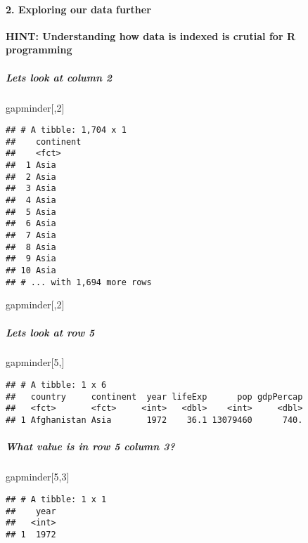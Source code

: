 \documentclass[]{article}
\newenvironment{Shaded}{\begin{snugshade}}{\end{snugshade}}
\newcommand{\DecValTok}[1]{\textcolor[rgb]{0.00,0.00,0.81}{#1}}
\newcommand{\NormalTok}[1]{#1}
\let\oldparagraph\paragraph
\renewcommand{\paragraph}[1]{\oldparagraph{#1}\mbox{}}
\let\oldsubparagraph\subparagraph
\renewcommand{\subparagraph}[1]{\oldsubparagraph{#1}\mbox{}}
\begin{document}
\paragraph{2. Exploring our data
further}\label{exploring-our-data-further}

\textbf{HINT: Understanding how data is indexed is crutial for R
programming}

\subparagraph{Lets look at column 2}\label{lets-look-at-column-2}

\begin{Shaded}
\begin{Highlighting}[]
\NormalTok{gapminder[,}\DecValTok{2}\NormalTok{]}
\end{Highlighting}
\end{Shaded}

\begin{verbatim}
## # A tibble: 1,704 x 1
##    continent
##    <fct>    
##  1 Asia     
##  2 Asia     
##  3 Asia     
##  4 Asia     
##  5 Asia     
##  6 Asia     
##  7 Asia     
##  8 Asia     
##  9 Asia     
## 10 Asia     
## # ... with 1,694 more rows
\end{verbatim}

gapminder{[},2{]}

\subparagraph{Lets look at row 5}\label{lets-look-at-row-5}

\begin{Shaded}
\begin{Highlighting}[]
\NormalTok{gapminder[}\DecValTok{5}\NormalTok{,]}
\end{Highlighting}
\end{Shaded}

\begin{verbatim}
## # A tibble: 1 x 6
##   country     continent  year lifeExp      pop gdpPercap
##   <fct>       <fct>     <int>   <dbl>    <int>     <dbl>
## 1 Afghanistan Asia       1972    36.1 13079460      740.
\end{verbatim}

\subparagraph{What value is in row 5 column
3?}\label{what-value-is-in-row-5-column-3}

\begin{Shaded}
\begin{Highlighting}[]
\NormalTok{gapminder[}\DecValTok{5}\NormalTok{,}\DecValTok{3}\NormalTok{]}
\end{Highlighting}
\end{Shaded}

\begin{verbatim}
## # A tibble: 1 x 1
##    year
##   <int>
## 1  1972
\end{verbatim}
\end{document}
